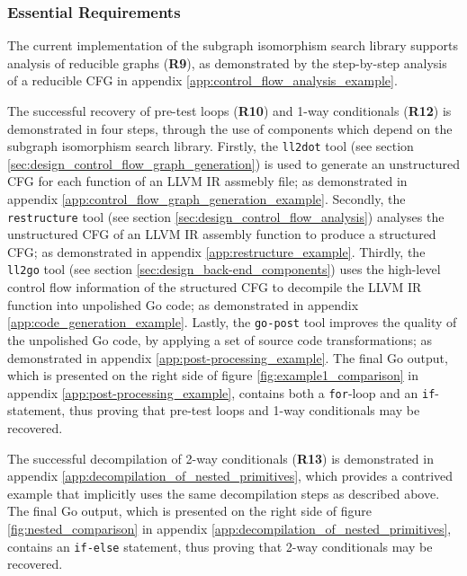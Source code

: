 
\subsubsection{Essential Requirements}
\label{sec:eval_control_flow_analysis_library_essential_requirements}


The current implementation of the subgraph isomorphism search library supports analysis of reducible graphs (\textbf{R9}), as demonstrated by the step-by-step analysis of a reducible CFG in appendix \ref{app:control_flow_analysis_example}.


The successful recovery of pre-test loops (\textbf{R10}) and 1-way conditionals (\textbf{R12}) is demonstrated in four steps, through the use of components which depend on the subgraph isomorphism search library. Firstly, the \texttt{ll2dot} tool (see section \ref{sec:design_control_flow_graph_generation}) is used to generate an unstructured CFG for each function of an LLVM IR assmebly file; as demonstrated in appendix \ref{app:control_flow_graph_generation_example}. Secondly, the \texttt{restructure} tool (see section \ref{sec:design_control_flow_analysis}) analyses the unstructured CFG of an LLVM IR assembly function to produce a structured CFG; as demonstrated in appendix \ref{app:restructure_example}. Thirdly, the \texttt{ll2go} tool (see section \ref{sec:design_back-end_components}) uses the high-level control flow information of the structured CFG to decompile the LLVM IR function into unpolished Go code; as demonstrated in appendix \ref{app:code_generation_example}. Lastly, the \texttt{go-post} tool improves the quality of the unpolished Go code, by applying a set of source code transformations; as demonstrated in appendix \ref{app:post-processing_example}. The final Go output, which is presented on the right side of figure \ref{fig:example1_comparison} in appendix \ref{app:post-processing_example}, contains both a \texttt{for}-loop and an \texttt{if}-statement, thus proving that pre-test loops and 1-way conditionals may be recovered.


The successful decompilation of 2-way conditionals (\textbf{R13}) is demonstrated in appendix \ref{app:decompilation_of_nested_primitives}, which provides a contrived example that implicitly uses the same decompilation steps as described above. The final Go output, which is presented on the right side of figure \ref{fig:nested_comparison} in appendix \ref{app:decompilation_of_nested_primitives}, contains an \texttt{if-else} statement, thus proving that 2-way conditionals may be recovered.

